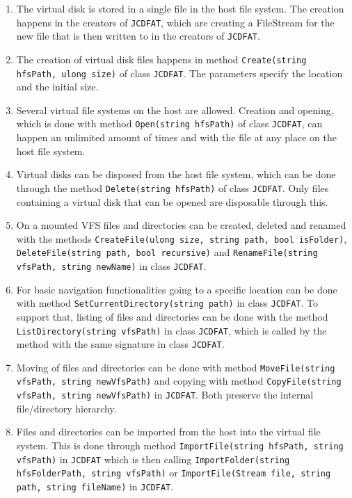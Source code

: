 \documentclass[a4paper,12pt]{article}
\begin{document}
\begin{enumerate}
	\item The virtual disk is stored in a single file in the host file system. The creation happens in the creators of \texttt{JCDFAT}, which are creating a FileStream for the new file that is then written to in the creators of \texttt{JCDFAT}.
	\item The creation of virtual disk files happens in method \texttt{Create(string hfsPath, ulong size)} of class \texttt{JCDFAT}. The parameters specify the location and the initial size.
	\item Several virtual file systems on the host are allowed. Creation and opening, which is done with method \texttt{Open(string hfsPath)} of class \texttt{JCDFAT}, can happen an unlimited amount of times and with the file at any place on the host file system.
	\item Virtual disks can be disposed from the host file system, which can be done through the method \texttt{Delete(string hfsPath)} of class \texttt{JCDFAT}. Only files containing a virtual disk that can be opened are disposable through this.
	\item On a mounted VFS files and directories can be created, deleted and renamed with the methods \texttt{CreateFile(ulong size, string path, bool isFolder)}, \texttt{DeleteFile(string path, bool recursive)} and \texttt{RenameFile(string vfsPath, string newName)} in class \texttt{JCDFAT}.
	\item For basic navigation functionalities going to a specific location can be done with method \texttt{SetCurrentDirectory(string path)} in class \texttt{JCDFAT}. To support that, listing of files and directories can be done with the method \texttt{ListDirectory(string vfsPath)} in class \texttt{JCDFAT}, which is called by the method with the same signature in class \texttt{JCDFAT}.
	\item Moving of files and directories can be done with method \texttt{MoveFile(string vfsPath, string newVfsPath)} and copying with method \texttt{CopyFile(string vfsPath, string newVfsPath)} in \texttt{JCDFAT}. Both preserve the internal file/directory hierarchy.
	\item Files and directories can be imported from the host into the virtual file system. This is done through method \texttt{ImportFile(string hfsPath, string vfsPath)} in \texttt{JCDFAT} which is then calling \texttt{ImportFolder(string hfsFolderPath, string vfsPath)} or \texttt{ImportFile(Stream file, string path, string fileName)} in \texttt{JCDFAT}.

\end{enumerate}
\end{document}

